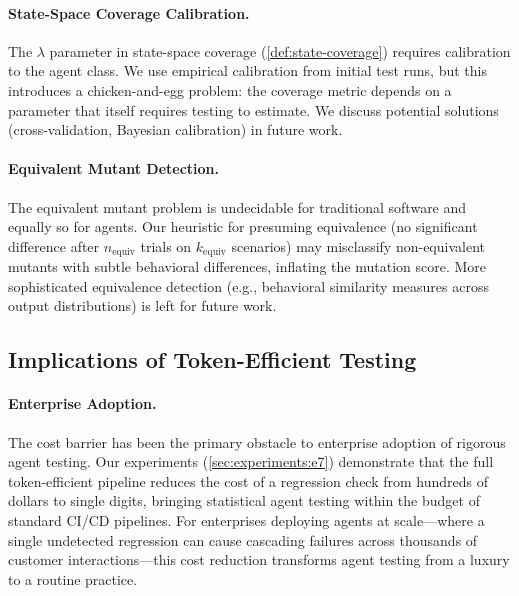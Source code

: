 \paragraph{State-Space Coverage Calibration.}
The $\lambda$ parameter in state-space coverage
(\cref{def:state-coverage}) requires calibration to the agent class.
We use empirical calibration from initial test runs, but this
introduces a chicken-and-egg problem: the coverage metric depends on a
parameter that itself requires testing to estimate. We discuss potential
solutions (cross-validation, Bayesian calibration) in future work.

\paragraph{Equivalent Mutant Detection.}
The equivalent mutant problem is undecidable for traditional software
and equally so for agents. Our heuristic for presuming equivalence
(no significant difference after $n_{\text{equiv}}$ trials on
$k_{\text{equiv}}$ scenarios) may misclassify non-equivalent mutants with
subtle behavioral differences, inflating the mutation score. More
sophisticated equivalence detection (e.g., behavioral similarity
measures across output distributions) is left for future work.

\subsection{Implications of Token-Efficient Testing}
\label{sec:discussion:token-implications}

\paragraph{Enterprise Adoption.}
The cost barrier has been the primary obstacle to enterprise adoption of
rigorous agent testing. Our experiments (\cref{sec:experiments:e7})
demonstrate that the full token-efficient pipeline reduces the cost of a
regression check from hundreds of dollars to single digits, bringing
statistical agent testing within the budget of standard CI/CD
pipelines. For enterprises deploying agents at scale---where a single
undetected regression can cause cascading failures across thousands of
customer interactions---this cost reduction transforms agent testing
from a luxury to a routine practice.

